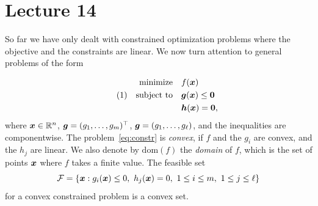 %
%
% 


\chapter*{Lecture 14}
\addtocounter{chapter}{14}


So far we have only dealt with constrained optimization problems where the objective and the constraints are linear. We now turn attention to general problems of the form

\begin{align*}\label{eq:constr}\tag{1}
\begin{split}
 \text{minimize}\quad & f(\bm{x})\\
 \quad\text{subject to}\quad & \bm{g}(\bm{x})\leq \bm{0}\\
         & \bm{h}(\bm{x})= \bm{0},
\end{split}
\end{align*}
where $\bm{x}\in \mathbb{R}^n$, $\bm{g}=(g_1,\dots,g_m)^{\top}$, $\bm{g}=(g_1,\dots,g_{\ell})$, and the inequalities are componentwise. 
The problem~\eqref{eq:constr} is {\em convex}, if $f$ and the $g_i$ are convex, and the $h_j$ are linear. We also denote by $\mathrm{dom}(f)$ the {\em domain} of $f$, which is the set of points $\bm{x}$ where $f$ takes a finite value. The feasible set
\begin{equation*}
 \mathcal{F} = \{\bm{x} \mathrel{\mathop{:}} g_i(\bm{x})\leq 0, \ h_j(\bm{x})=0, \ 1\leq i\leq m, \ 1\leq j\leq \ell\}
\end{equation*}
for a convex constrained problem is a convex set.

